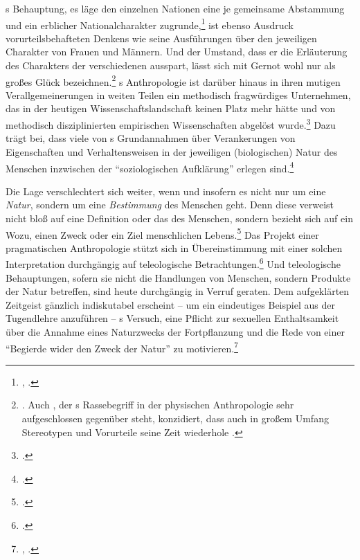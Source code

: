 s Behauptung, es läge den einzelnen Nationen eine je
gemeinsame Abstammung und ein erblicher Nationalcharakter
zugrunde,\footnote{\cite[Vgl.][A~297--301]{Kant:AnthropologieinpragmatischerHinsicht1977},
\cite[VII: 311.6--313.16]{Kant:GesammelteWerke1900ff.}.} ist ebenso Ausdruck
vorurteilsbehafteten Denkens wie seine Ausführungen über den jeweiligen
Charakter von Frauen und Männern. Und der Umstand, dass er die Erläuterung des Charakters der verschiedenen
 ausspart, lässt sich mit Gernot 
wohl nur als großes Glück
bezeichnen.\footnote{\cite[Vgl.][271]{Boehme:AnthropologieinpragmatischerHinsicht1985}.
Auch ,
der s Rassebegriff in der physischen Anthropologie sehr
aufgeschlossen gegenüber steht, konzidiert, dass  auch in
großem Umfang Stereotypen und Vorurteile seine Zeit wiederhole
\parencite[vgl.][349]{Doerflinger:DieEinheitderMenschheitalsTiergattung2001}.}
s Anthropologie ist darüber hinaus in ihren mutigen
Verallgemeinerungen in weiten Teilen ein methodisch fragwürdiges Unternehmen, das in
der heutigen Wissenschaftslandschaft keinen Platz mehr hätte und von methodisch
disziplinierten empirischen Wissenschaften abgelöst
wurde.\footcite[Vgl.][167-173]{Schmidt:KantsTranscendentalEmpiricalPragmaticandMoralAnthropology2007}
Dazu trägt bei, dass viele von s Grundannahmen über
Verankerungen von Eigenschaften und Verhaltensweisen in der jeweiligen
(biologischen) Natur des Menschen inzwischen der \enquote{soziologischen
Aufklärung} erlegen sind.\footcite[Vgl.][272]{Boehme:AnthropologieinpragmatischerHinsicht1985}

Die Lage verschlechtert sich weiter, wenn und insofern es nicht nur um eine
\emph{Natur}, sondern um eine \emph{Bestimmung} des Menschen geht. Denn diese verweist nicht
bloß auf eine Definition oder das  des Menschen, sondern bezieht
sich auf ein Wozu, einen Zweck oder ein Ziel menschlichen
Lebens.\footcite[Vgl.][86--87,
93]{Brandt:TheGuidingIdeaofKantsAnthropologyandtheVocationoftheHumanBeing2003}
Das Projekt einer pragmatischen Anthropologie stützt sich in Übereinstimmung mit einer solchen Interpretation durchgängig auf teleologische
Betrachtungen.\footnote{\cite[Vgl.][65--67]{Cohen:KantandtheHumanSciences2009}.}
Und teleologische Behauptungen, sofern sie nicht die Handlungen von Menschen,
sondern Produkte der Natur betreffen, sind heute durchgängig in Verruf geraten.
Dem aufgeklärten Zeitgeist gänzlich indiskutabel erscheint -- um ein eindeutiges
Beispiel aus der Tugendlehre anzuführen -- s Versuch, eine Pflicht
zur sexuellen Enthaltsamkeit über die Annahme eines Naturzwecks der
Fortpflanzung und die Rede von einer \enquote{Begierde wider den Zweck der
Natur} zu motivieren.\footnote{\cite[][\S~7]{Kant:DieMetaphysikderSitten1977Tugendlehre}, \cite[VI:
424.12--426.32]{Kant:GesammelteWerke1900ff.}.}


